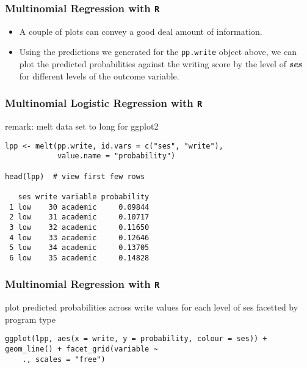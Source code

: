 \documentclass[00-GLMregslides.tex]{subfiles}
\begin{document}
\begin{frame}[fragile]

\frametitle{Multinomial Regression with \texttt{R}}
\Large
\begin{itemize}
\item A couple of plots can convey a good deal amount of information. 
\item Using the predictions we generated for the \texttt{pp.write} object above, we can plot the predicted probabilities against the writing score by the level 
of \textbf{\textit{ses}} for different levels of the outcome variable.
\end{itemize} 
\end{frame}
\begin{frame}[fragile]

\frametitle{Multinomial Logistic Regression with \texttt{R}}
\large
remark: melt data set to long for ggplot2
\begin{verbatim}
lpp <- melt(pp.write, id.vars = c("ses", "write"),
            value.name = "probability")
 
head(lpp)  # view first few rows
 
   ses write variable probability
 1 low    30 academic     0.09844
 2 low    31 academic     0.10717
 3 low    32 academic     0.11650
 4 low    33 academic     0.12646
 5 low    34 academic     0.13705
 6 low    35 academic     0.14828
\end{verbatim}
\end{frame}
\begin{frame}[fragile]

\frametitle{Multinomial Regression with \texttt{R}}
\Large 
 plot predicted probabilities across write values for each level of ses
 facetted by program type
\begin{verbatim}
ggplot(lpp, aes(x = write, y = probability, colour = ses)) + geom_line() + facet_grid(variable ~
    ., scales = "free")
 
\end{verbatim}
\end{frame}
\end{document}
